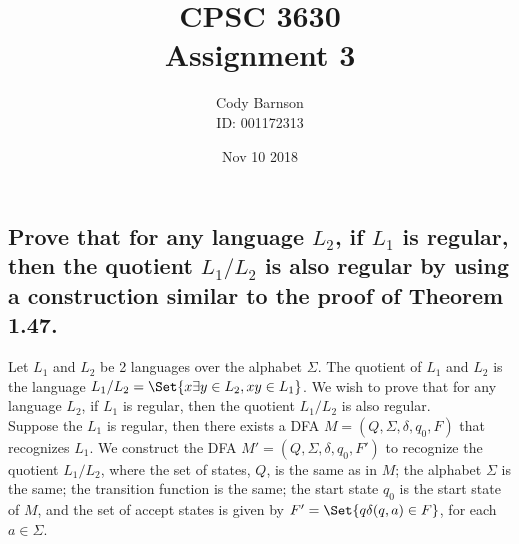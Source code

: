 \documentclass{article}
\providecommand\given{} %
\renewcommand{\thesubsection}{\arabic{subsection}}
\begin{document}
\title{CPSC 3630\\Assignment 3}
\author{Cody Barnson\\ ID: 001172313}
\date{Nov 10 2018}


\maketitle
\newpage

\newpage


\renewcommand{\thesubsubsection}{\thesubsection.\alph{subsubsection}}



\section*{}

\subsection{Prove that for any language $L_2$, if $L_1$ is regular, then the quotient $L_1/L_2$ is also regular by using a construction similar to the proof of Theorem 1.47.}

Let $L_1$ and $L_2$ be 2 languages over the alphabet $\Sigma$.  The quotient of $L_1$ and $L_2$ is the language $L_1/L_2 = \Set{x \given \exists y \in L_2, xy \in L_1}$.  We wish to prove that for any language $L_2$, if $L_1$ is regular, then the quotient $L_1/L_2$ is also regular. \\

Suppose the $L_1$ is regular, then there exists a DFA $M = (Q, \Sigma, \delta, q_0, F)$ that recognizes $L_1$.  We construct the DFA $M' = (Q, \Sigma, \delta, q_0, F')$ to recognize the quotient $L_1/L_2$, where the set of states, $Q$, is the same as in $M$; the alphabet $\Sigma$ is the same; the transition function is the same; the start state $q_0$ is the start state of $M$, and the set of accept states is given by $F' = \Set{q \given \delta(q, a) \in F}$, for each $a \in \Sigma$.  \\
\end{document}
